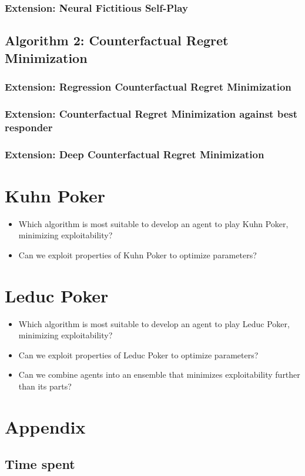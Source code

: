 \documentclass[10pt,a4paper]{article}
\begin{document}
\subsubsection{Extension: Neural Fictitious Self-Play}
\subsection{Algorithm 2: Counterfactual Regret Minimization}
\subsubsection{Extension: Regression Counterfactual Regret Minimization}
\subsubsection{Extension: Counterfactual Regret Minimization against best responder}
\subsubsection{Extension: Deep Counterfactual Regret Minimization}


\section{Kuhn Poker}
\begin{tcolorbox}
\begin{itemize}
\item{Which algorithm is most suitable to develop an agent to play Kuhn Poker, minimizing exploitability?}
\item{Can we exploit properties of Kuhn Poker to optimize parameters?}
\end{itemize}
\end{tcolorbox}

\section{Leduc Poker}
\begin{tcolorbox}
\begin{itemize}
\item{Which algorithm is most suitable to develop an agent to play Leduc Poker, minimizing exploitability?}
\item{Can we exploit properties of Leduc Poker to optimize parameters?}
\item{Can we combine agents into an ensemble that minimizes exploitability further than its parts?}
\end{itemize}
\end{tcolorbox}




\section*{Appendix}
\subsection{Time spent}
\end{document}
